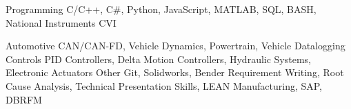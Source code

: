 

\begin{cvskills}

  \cvskill
    {Programming} %
    {C/C++, C\#, Python, JavaScript, MATLAB, SQL, BASH, National Instruments CVI} %

  \cvskill
    {Automotive} %
    {CAN/CAN-FD, Vehicle Dynamics, Powertrain, Vehicle Datalogging} %
  \cvskill
    {Controls} %
    {PID Controllers, Delta Motion Controllers, Hydraulic Systems, Electronic Actuators} %
  \cvskill
    {Other} %
    {Git, Solidworks, Bender Requirement Writing, Root Cause Analysis, Technical Presentation Skills, LEAN Manufacturing, SAP, DBRFM} %

\end{cvskills}
